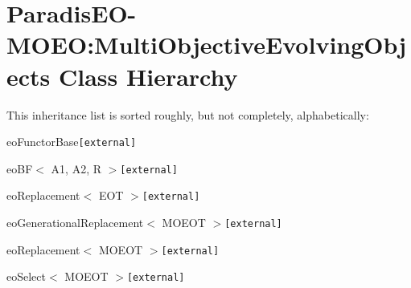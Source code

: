 \section{Paradis\-EO-MOEO:Multi\-Objective\-Evolving\-Objects Class Hierarchy}
This inheritance list is sorted roughly, but not completely, alphabetically:\begin{CompactList}
\item eo\-Functor\-Base{\tt  [external]}\begin{CompactList}
\item eo\-BF$<$ A1, A2, R $>${\tt  [external]}\begin{CompactList}
\item eo\-Replacement$<$ EOT $>${\tt  [external]}\begin{CompactList}
\item eo\-Generational\-Replacement$<$ MOEOT $>${\tt  [external]}\begin{CompactList}
\item {}
\end{CompactList}
\end{CompactList}
\item eo\-Replacement$<$ MOEOT $>${\tt  [external]}\begin{CompactList}
\item {}
\begin{CompactList}
\item {}
\item {}
\item {}
\end{CompactList}
\end{CompactList}
\item eo\-Select$<$ MOEOT $>${\tt  [external]}\begin{CompactList}
\item {}
\end{CompactList}
\item {}

\end{CompactList}
\end{CompactList}
\end{CompactList}
